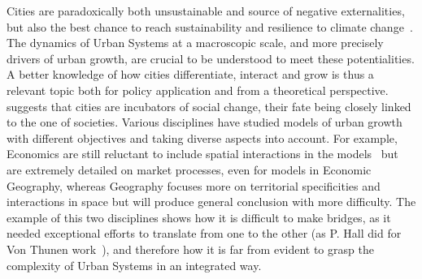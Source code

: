 \documentclass[Royal,sageh,times]{sagej}
\begin{document}
Cities are paradoxically both unsustainable and source of negative externalities, but also the best chance to reach sustainability and resilience to climate change~\citep{glaeser2011triumph}. The dynamics of Urban Systems at a macroscopic scale, and more precisely drivers of urban growth, are crucial to be understood to meet these potentialities. A better knowledge of how cities differentiate, interact and grow is thus a relevant topic both for policy application and from a theoretical perspective. \cite{pumain2009innovation} suggests that cities are incubators of social change, their fate being closely linked to the one of societies. Various disciplines have studied models of urban growth with different objectives and taking diverse aspects into account. For example, Economics are still reluctant to include spatial interactions in the models~\citep{krugman1998space} but are extremely detailed on market processes, even for models in Economic Geography, whereas Geography focuses more on territorial specificities and interactions in space but will produce general conclusion with more difficulty. The example of this two disciplines shows how it is difficult to make bridges, as it needed exceptional efforts to translate from one to the other (as P. Hall did for Von Thunen work~\citep{taylor2016polymath}), and therefore how it is far from evident to grasp the complexity of Urban Systems in an integrated way.
\end{document}
